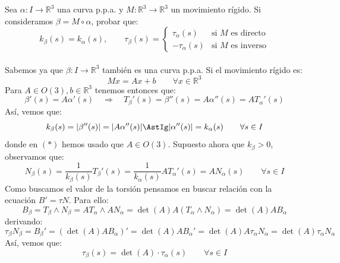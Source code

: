 \begin{ejercicio}\label{ej:mov_rig_torsion}
    Sea $\alpha:I\to\mathbb{R}^3$ una curva p.p.a. y $M:\mathbb{R}^3\to\mathbb{R}^3$ un movimiento rígido. Si consideramos $\beta = M\circ \alpha$, probar que:
    \begin{equation*}
        k_\beta(s) = k_{\alpha}(s), \qquad \tau_\beta(s) = \left\{\begin{array}{ll}
            \tau_\alpha(s) & \text{si\ } M \text{\ es directo} \\
            -\tau_\alpha(s) & \text{si\ } M \text{\ es inverso}
        \end{array}\right. 
    \end{equation*}~\\

    \noindent
    Sabemos ya que $\beta:I\to\mathbb{R}^3$  también es una curva p.p.a. Si el movimiento rígido es:
    \begin{equation*}
        Mx = Ax + b \qquad \forall x\in \mathbb{R}^3
    \end{equation*}
    Para $A\in O(3), b\in \mathbb{R}^3$ tenemos entonces que:
    \begin{equation*}
        \beta'(s) = A\alpha'(s) \quad\Longrightarrow\quad T_\beta'(s) = \beta''(s) = A\alpha''(s) = AT_\alpha'(s)
    \end{equation*}
    Así, vemos que:
    \begin{equation*}
        k_\beta(s) = |\beta''(s)| = |A\alpha''(s)| \AstIg |\alpha''(s)| = k_\alpha(s) \qquad \forall s\in I
    \end{equation*}
    donde en $(\ast)$ hemos usado que $A\in O(3)$. Supuesto ahora que $k_\beta>0$, observamos que:
    \begin{equation*}
        N_\beta(s) = \frac{1}{k_\beta(s)}T_\beta'(s) = \frac{1}{k_\alpha(s)}AT_\alpha'(s) = AN_\alpha(s) \qquad \forall s\in I
    \end{equation*}
    Como buscamos el valor de la torsión pensamos en buscar relación con la ecuación $B'=\tau N$. Para ello:
    \begin{equation*}
        B_\beta = T_\beta\land N_\beta = AT_\alpha \land AN_\alpha = \det(A)A(T_\alpha\land N_\alpha) = \det(A)AB_\alpha
    \end{equation*}
    derivando:
    \begin{equation*}
        \tau_\beta N_\beta = B_\beta' = (\det(A)AB_\alpha)' = \det(A)AB_\alpha' = \det(A)A\tau_\alpha N_\alpha = \det(A)\tau_\alpha N_\alpha
    \end{equation*}
    Así, vemos que:
    \begin{equation*}
        \tau_\beta(s) = \det(A)\cdot \tau_\alpha(s) \qquad \forall s\in I
    \end{equation*}
\end{ejercicio}

